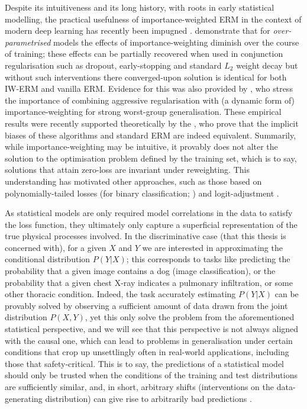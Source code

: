 Despite its intuitiveness and its long history, with roots in early statistical modelling, the
practical usefulness of importance-weighted ERM in the context of modern deep learning has recently
been impugned \citep{byrd2019effect, zhai2022understanding}.
%
\cite{byrd2019effect} demonstrate that for \emph{over-parametrised} models the effects of
importance-weighting diminish over the course of training; these effects can be partially recovered
when used in conjunction regularisation such as dropout, early-stopping and standard \(L_2\) weight
decay but without such interventions there converged-upon solution is identical for both IW-ERM and
vanilla ERM. 
%
Evidence for this was also provided by \cite{sagawa2019distributionally}, who stress the importance
of combining aggressive regularisation with (a dynamic form of) importance-weighting for
strong worst-group generalisation.
%
These empirical results were recently supported theoretically by the \cite{zhai2022understanding},
who prove that the implicit biases of these algorithms and standard ERM are indeed equivalent.
%
Summarily, while importance-weighting may be intuitive, it provably does not alter the solution to
the optimisation problem defined by the training set, which is to say, solutions that attain
zero-loss are invariant under reweighting.
%
This understanding has motivated other approaches, such as those based on polynomially-tailed
losses (for binary classification; \cite{wang2021importance}) and logit-adjustment
\citep{menon2020long}.
%

As statistical models are only required model correlations in the data to satisfy the loss
function, they ultimately only capture a superficial representation of the true physical processes
involved.
%
In the discriminative case (that this thesis is concerned with), for a given \( X \) and \( Y \) we
are interested in approximating the conditional distribution \( P(Y|X) \); this  corresponds to
tasks like predicting the probability that a given image contains a dog (image classification), or
the probability that a given chest X-ray indicates a pulmonary infiltration, or some other thoracic
condition.
%
Indeed, the task accurately estimating \( P(Y | X) \) can be provably solved by observing a
sufficient amount of \iid{} data drawn from the joint distribution \( P(X,Y) \), yet this only
solve the problem from the aforementioned statistical perspective, and we will see that this
perspective is not always aligned with the causal one, which can lead to problems in generalisation
under certain conditions that crop up unsettlingly often in real-world applications, including
those that safety-critical.
%
This is to say, the predictions of a statistical model should only be trusted when the conditions
of the training and test distributions are sufficiently similar, and, in short, arbitrary shifts
(interventions on the data-generating distribution) can give rise to arbitrarily bad predictions
\citep{pearl2009causality, scholkopf2012causal}.

